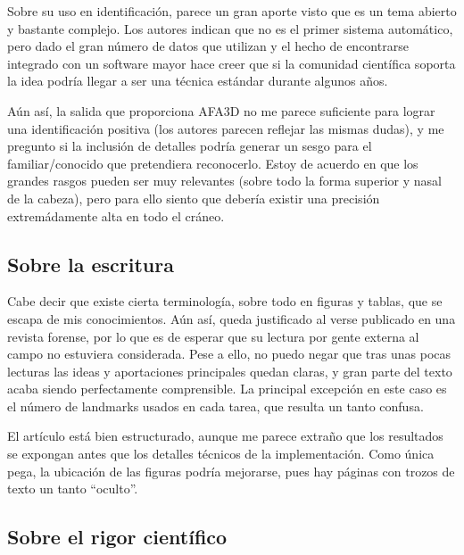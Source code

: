 \documentclass[13pt,a4paper]{article}
\begin{document}
\vspace{\baselineskip}

Sobre su uso en identificación, parece un gran aporte visto que es un tema abierto y bastante complejo. Los autores indican que no es el primer sistema automático, pero dado el gran número de datos que utilizan y el hecho de encontrarse integrado con un software mayor hace creer que si la comunidad científica soporta la idea podría llegar a ser una técnica estándar durante algunos años.

\vspace{\baselineskip}

Aún así, la salida que proporciona AFA3D no me parece suficiente para lograr una identificación positiva (los autores parecen reflejar las mismas dudas), y me pregunto si la inclusión de detalles podría generar un sesgo para el familiar/conocido que pretendiera reconocerlo. Estoy de acuerdo en que los grandes rasgos pueden ser muy relevantes (sobre todo la forma superior y nasal de la cabeza), pero para ello siento que debería existir una precisión extremádamente alta en todo el cráneo.

\subsection{Sobre la escritura}

Cabe decir que existe cierta terminología, sobre todo en figuras y tablas, que se escapa de mis conocimientos. Aún así, queda justificado al verse publicado en una revista forense, por lo que es de esperar que su lectura por gente externa al campo no estuviera considerada. Pese a ello, no puedo negar que tras unas pocas lecturas las ideas y aportaciones principales quedan claras, y gran parte del texto acaba siendo perfectamente comprensible. La principal excepción en este caso es el número de landmarks usados en cada tarea, que resulta un tanto confusa.

\vspace{\baselineskip}

El artículo está bien estructurado, aunque me parece extraño que los resultados se expongan antes que los detalles técnicos de la implementación. Como única pega, la ubicación de las figuras podría mejorarse, pues hay páginas con trozos de texto un tanto ``oculto''.

\subsection{Sobre el rigor científico} %
\end{document}
